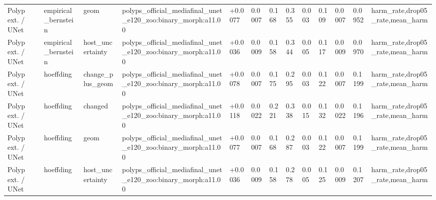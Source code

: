\begin{table}[t]
\begin{tabular}{lllllllllllll}
Polyp ext. / UNet & empirical\_bernstein & geom & polyps\_official\_mediafinal\_unet\_e120\_zoo:binary\_morph:a11.00 & +0.0077 & 0.0007 & 0.168 & 0.355 & 0.003 & 0.109 & 0.0007 & 0.0952 & harm\_rate,drop05\_rate,mean\_harm \\
Polyp ext. / UNet & empirical\_bernstein & host\_uncertainty & polyps\_official\_mediafinal\_unet\_e120\_zoo:binary\_morph:a11.00 & +0.0036 & 0.0009 & 0.158 & 0.344 & 0.005 & 0.117 & 0.0009 & 0.0970 & harm\_rate,drop05\_rate,mean\_harm \\
Polyp ext. / UNet & hoeffding & change\_plus\_geom & polyps\_official\_mediafinal\_unet\_e120\_zoo:binary\_morph:a11.00 & +0.0078 & 0.0007 & 0.175 & 0.295 & 0.003 & 0.122 & 0.0007 & 0.1199 & harm\_rate,drop05\_rate,mean\_harm \\
Polyp ext. / UNet & hoeffding & changed & polyps\_official\_mediafinal\_unet\_e120\_zoo:binary\_morph:a11.00 & +0.0118 & 0.0022 & 0.221 & 0.338 & 0.015 & 0.132 & 0.0022 & 0.1196 & harm\_rate,drop05\_rate,mean\_harm \\
Polyp ext. / UNet & hoeffding & geom & polyps\_official\_mediafinal\_unet\_e120\_zoo:binary\_morph:a11.00 & +0.0077 & 0.0007 & 0.168 & 0.287 & 0.003 & 0.122 & 0.0007 & 0.1199 & harm\_rate,drop05\_rate,mean\_harm \\
Polyp ext. / UNet & hoeffding & host\_uncertainty & polyps\_official\_mediafinal\_unet\_e120\_zoo:binary\_morph:a11.00 & +0.0036 & 0.0009 & 0.158 & 0.278 & 0.005 & 0.125 & 0.0009 & 0.1207 & harm\_rate,drop05\_rate,mean\_harm \\
\bottomrule
\end{tabular}
\end{table}

